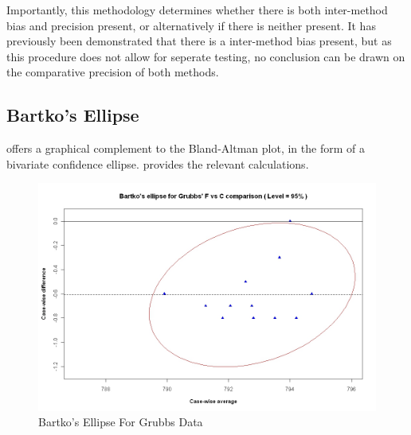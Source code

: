 \documentclass[12pt, a4paper]{article}
\begin{document}
Importantly, this methodology determines whether there is both
inter-method bias and precision present, or alternatively if there
is neither present. It has previously been demonstrated that there
is a inter-method bias present, but as this procedure does not
allow for seperate testing, no conclusion can be drawn on the
comparative precision of both methods.
\newpage
\subsection{Bartko's Ellipse}
\citet{Bartko} offers a graphical complement to the Bland-Altman
plot, in the form of a bivariate confidence ellipse.
\citet{AltmanEllipse} provides the relevant calculations.

\begin{figure}[h!]
  \includegraphics[width=130mm]{GrubbsBartko.jpeg}
  \caption{Bartko's Ellipse For Grubbs Data}\label{GrubbsBartko}
\end{figure}



\end{document}
